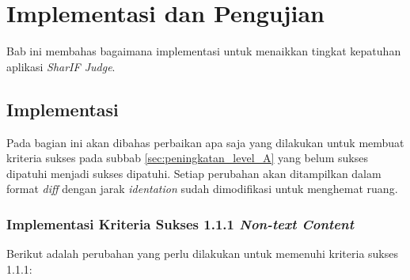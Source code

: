 \chapter{Implementasi dan Pengujian}
\label{chap:implementasi}

Bab ini membahas bagaimana implementasi untuk menaikkan tingkat kepatuhan aplikasi \textit{SharIF Judge}.

\section{Implementasi}
\label{sec:implementasi}

Pada bagian ini akan dibahas perbaikan apa saja yang dilakukan untuk membuat kriteria sukses pada subbab \ref{sec:peningkatan_level_A}
yang belum sukses dipatuhi menjadi sukses dipatuhi. Setiap perubahan akan ditampilkan dalam format \textit{diff} dengan jarak \textit{identation} sudah dimodifikasi untuk menghemat ruang.

\subsection{Implementasi Kriteria Sukses 1.1.1 \textit{Non-text Content}}
\label{subsec:implementasi_A_1.1.1}

Berikut adalah perubahan yang perlu dilakukan untuk memenuhi kriteria sukses 1.1.1:

